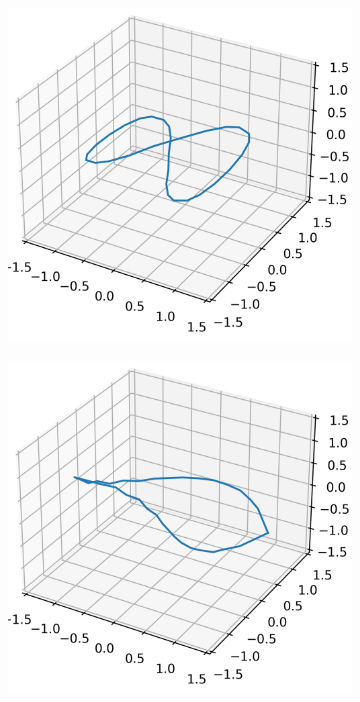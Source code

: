 \documentclass[../dissertation.tex]{subfiles}
\begin{document}
\begin{figure}[tbp]
    \centering
    \begin{subfigure}[b]{0.32\textwidth}
        \centering
        \includegraphics[width=\textwidth]{sections/unknottingCurveImgs/figure8-L2-0}
    \end{subfigure}
    \begin{subfigure}[b]{0.32\textwidth}
        \centering
        \includegraphics[width=\textwidth]{sections/unknottingCurveImgs/figure8-L2-1}

\end{subfigure}
\end{figure}
\end{document}
